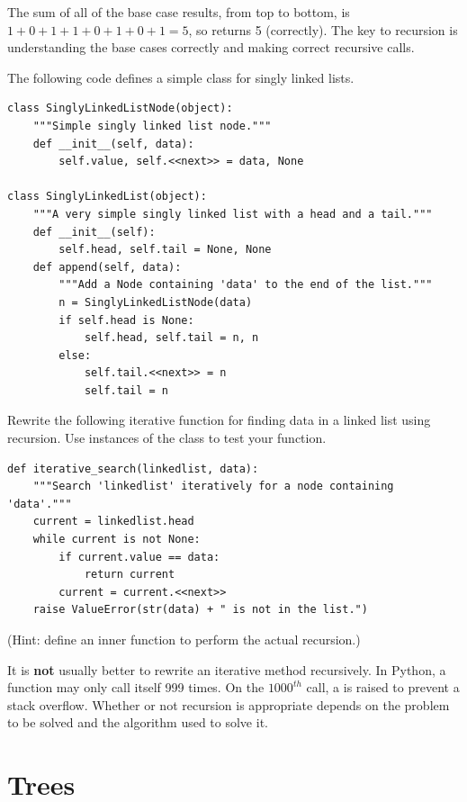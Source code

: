 The sum of all of the base case results, from top to bottom, is $1 + 0 + 1 + 1 + 0 + 1 + 0 + 1 = 5$, so  returns 5 (correctly).
The key to recursion is understanding the base cases correctly and making correct recursive calls.

\begin{problem} %
The following code defines a simple class for singly linked lists.
\begin{lstlisting}
class SinglyLinkedListNode(object):
    """Simple singly linked list node."""
    def __init__(self, data):
        self.value, self.<<next>> = data, None

class SinglyLinkedList(object):
    """A very simple singly linked list with a head and a tail."""
    def __init__(self):
        self.head, self.tail = None, None
    def append(self, data):
        """Add a Node containing 'data' to the end of the list."""
        n = SinglyLinkedListNode(data)
        if self.head is None:
            self.head, self.tail = n, n
        else:
            self.tail.<<next>> = n
            self.tail = n
\end{lstlisting}
Rewrite the following iterative function for finding data in a linked list using recursion.
Use instances of the  class to test your function.
\begin{lstlisting}
def iterative_search(linkedlist, data):
    """Search 'linkedlist' iteratively for a node containing 'data'."""
	current = linkedlist.head
	while current is not None:
		if current.value == data:
			return current
		current = current.<<next>>
	raise ValueError(str(data) + " is not in the list.")
\end{lstlisting}
(Hint: define an inner function to perform the actual recursion.)
\label{prob:recursion}
\end{problem}

\begin{warn} %
It is \textbf{not} usually better to rewrite an iterative method recursively.
In Python, a function may only call itself 999 times.
On the $1000^{th}$ call, a  is raised to prevent a stack overflow.
Whether or not recursion is appropriate depends on the problem to be solved and the algorithm used to solve it.
\end{warn}

\section*{Trees} %

